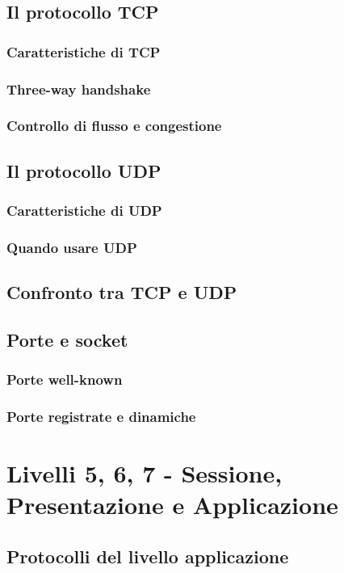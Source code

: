 \documentclass[12pt,a4paper]{article}
\begin{document}
\subsection{Il protocollo TCP}
\subsubsection{Caratteristiche di TCP}
\subsubsection{Three-way handshake}
\subsubsection{Controllo di flusso e congestione}
\subsection{Il protocollo UDP}
\subsubsection{Caratteristiche di UDP}
\subsubsection{Quando usare UDP}
\subsection{Confronto tra TCP e UDP}
\subsection{Porte e socket}
\subsubsection{Porte well-known}
\subsubsection{Porte registrate e dinamiche}

\section{Livelli 5, 6, 7 - Sessione, Presentazione e Applicazione}
\subsection{Protocolli del livello applicazione}
\end{document}
